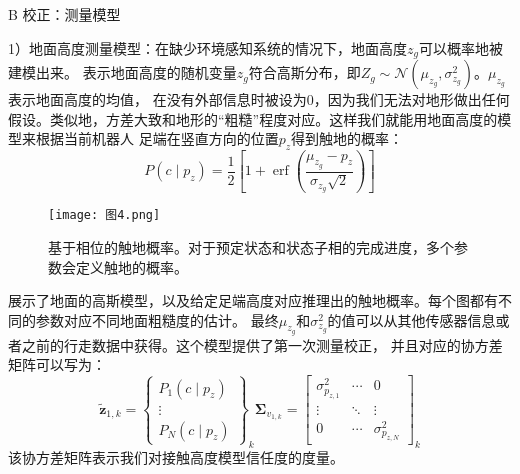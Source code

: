 B 校正：测量模型

1）地面高度测量模型：在缺少环境感知系统的情况下，地面高度$z_g$可以概率地被建模出来。
表示地面高度的随机变量$z_g$符合高斯分布，即$Z_g \sim \mathcal{N}\left(\mu_{z_g}, \sigma_{z_g}^2\right)$。$\mu_{z_g}$表示地面高度的均值，
在没有外部信息时被设为0，因为我们无法对地形做出任何假设。类似地，方差大致和地形的“粗糙”程度对应。这样我们就能用地面高度的模型来根据当前机器人
足端在竖直方向的位置$p_z$得到触地的概率：
\begin{equation}
    \label{equ:est_height_prob}
    P\left(c \mid p_z\right)=\frac{1}{2}\left[1+\operatorname{erf}\left(\frac{\mu_{z_g}-p_z}{\sigma_{z_g} \sqrt{2}}\right)\right]
\end{equation}
\begin{figure}[htbp]
    \centering
    \texttt{[image: 图4.png]}
    \caption{\label{fig:gauss_height}基于相位的触地概率。对于预定状态和状态子相的完成进度，多个参数会定义触地的概率。}
\end{figure}
展示了地面的高斯模型，以及给定足端高度对应推理出的触地概率。每个图都有不同的参数对应不同地面粗糙度的估计。
最终$\mu_{z_g}$和$\sigma_{z_g}^2$的值可以从其他传感器信息或者之前的行走数据中获得。这个模型提供了第一次测量校正，
并且对应的协方差矩阵可以写为：
\begin{equation}
    \label{equ:est_height_noise}
    \tilde{\boldsymbol{z}}_{1, k}=\left\{\begin{array}{c}
        P_1\left(c \mid p_z\right) \\
        \vdots \\
        P_N\left(c \mid p_z\right)
        \end{array}\right\}_k \boldsymbol{\Sigma}_{v_{1, k}}=\left[\begin{array}{ccc}
        \sigma_{p_{z, 1}}^2 & \cdots & 0 \\
        \vdots & \ddots & \vdots \\
        0 & \cdots & \sigma_{p_{z, N}}^2
        \end{array}\right]_k
\end{equation}
该协方差矩阵表示我们对接触高度模型信任度的度量。


